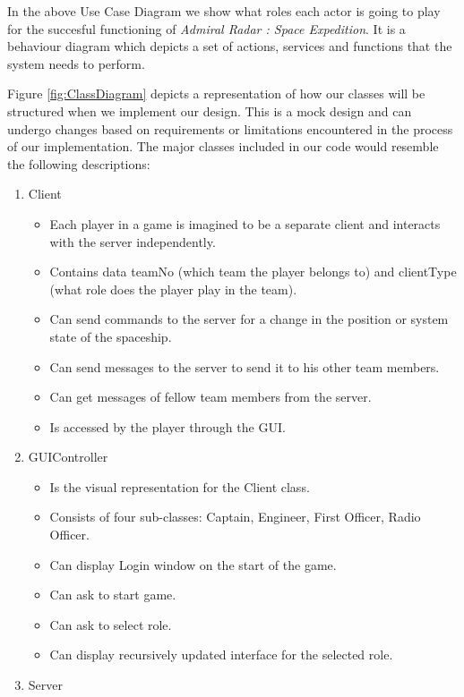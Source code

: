 
In the above Use Case Diagram we show what roles each actor is going to play for the succesful functioning of \textit{Admiral Radar : Space Expedition}. It is a behaviour diagram which depicts a set of actions, services and functions that the system needs to perform.


Figure \ref{fig:ClassDiagram} depicts a representation of how our classes will be structured when we implement our design. This is a mock design and can undergo changes based on requirements or limitations encountered in the process of our implementation. The major classes included in our code would resemble the following descriptions: 

\begin{enumerate}
\item Client
\begin{itemize}
\item Each player in a game is imagined to be a separate client and interacts with the server independently.
\item Contains data teamNo (which team the player belongs to) and clientType (what role does the player play in the team).
\item Can send commands to the server for a change in the position or system state of the spaceship.
\item Can send messages to the server to send it to his other team members.
\item Can get messages of fellow team members from the server.
\item Is accessed by the player through the GUI.
\end{itemize}
\item GUIController
\begin{itemize}
\item Is the visual representation for the Client class.
\item Consists of four sub-classes: Captain, Engineer, First Officer, Radio Officer.
\item Can display Login window on the start of the game.
\item Can ask to start game.
\item Can ask to select role.
\item Can display recursively updated interface for the selected role.
\end{itemize}
\item Server

\end{enumerate}
